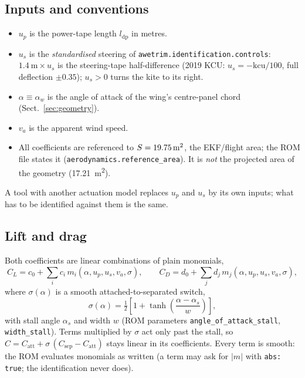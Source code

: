 \documentclass[11pt,a4paper]{article}
\newcommand{\code}[1]{\texttt{\small #1}}
\begin{document}
\subsection{Inputs and conventions}
\begin{itemize}
  \item $u_p$ is the power-tape length $l_\mathrm{dp}$ in metres.
  \item $u_s$ is the \emph{standardised} steering of
        \code{awetrim.identification.controls}: $\SI{1.4}{\metre}\times u_s$ is the
        steering-tape half-difference (2019 KCU: $u_s=-\mathrm{kcu}/100$, full
        deflection $\pm0.35$); $u_s>0$ turns the kite to its right.
  \item $\alpha\equiv\alpha_w$ is the angle of attack of the wing's
        centre-panel chord (Sect.~\ref{sec:geometry}).
  \item $v_a$ is the apparent wind speed.
  \item All coefficients are referenced to $S=\SI{19.75}{\square\metre}$, the
        EKF/flight area; the ROM file states
        it (\code{aerodynamics.reference\_area}). It is \emph{not} the projected
        area of the geometry (\SI{17.21}{\square\metre}).
\end{itemize}
A tool with another actuation model replaces $u_p$ and $u_s$ by its own
inputs; what has to be identified against them is the same.

\subsection{Lift and drag}
Both coefficients are linear combinations of plain monomials,
\begin{equation}
  C_L = c_0 + \sum_i c_i\, m_i(\alpha,u_p,u_s,v_a,\sigma), \qquad
  C_D = d_0 + \sum_j d_j\, m_j(\alpha,u_p,u_s,v_a,\sigma),
  \label{eq:polys}
\end{equation}
where $\sigma(\alpha)$ is a smooth attached-to-separated switch,
\begin{equation}
  \sigma(\alpha) = \tfrac12\left[1+\tanh\!\left(\frac{\alpha-\alpha_s}{w}\right)\right],
  \label{eq:stall}
\end{equation}
with stall angle $\alpha_s$ and width $w$ (ROM parameters
\code{angle\_of\_attack\_stall}, \code{width\_stall}). Terms multiplied by
$\sigma$ act only past the stall, so $C=C_\mathrm{att}+\sigma\,(C_\mathrm{sep}-C_\mathrm{att})$
stays linear in its coefficients. Every term is smooth: the ROM evaluates
monomials as written (a term may ask for $|m|$ with \code{abs: true}; the
identification never does).
\end{document}
